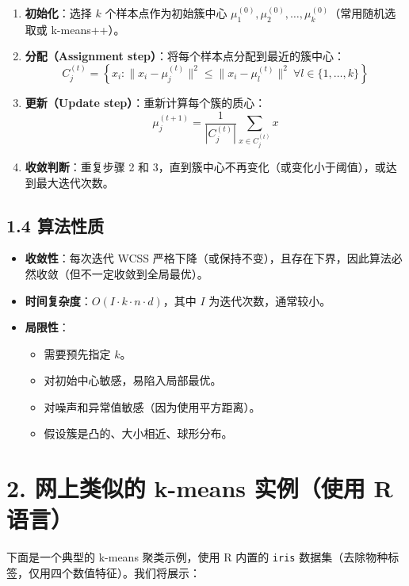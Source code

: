 \documentclass[
]{article}
\providecommand{\tightlist}{%
  \setlength{\itemsep}{0pt}\setlength{\parskip}{0pt}}
\begin{document}
\begin{enumerate}
\def\labelenumi{\arabic{enumi}.}
\tightlist
\item
  \textbf{初始化}：选择 \(k\) 个样本点作为初始簇中心
  \(\mu_1^{(0)}, \mu_2^{(0)}, \dots, \mu_k^{(0)}\)（常用随机选取或
  k-means++）。
\item
  \textbf{分配（Assignment step）}：将每个样本点分配到最近的簇中心： \[
  C_j^{(t)} = \left\{ x_i : \|x_i - \mu_j^{(t)}\|^2 \le \|x_i - \mu_l^{(t)}\|^2 \ \forall l \in \{1,\dots,k\} \right\}
  \]
\item
  \textbf{更新（Update step）}：重新计算每个簇的质心： \[
  \mu_j^{(t+1)} = \frac{1}{|C_j^{(t)}|} \sum_{x \in C_j^{(t)}} x
  \]
\item
  \textbf{收敛判断}：重复步骤 2 和
  3，直到簇中心不再变化（或变化小于阈值），或达到最大迭代次数。
\end{enumerate}

\subsection{1.4 算法性质}\label{ux7b97ux6cd5ux6027ux8d28}

\begin{itemize}
\tightlist
\item
  \textbf{收敛性}：每次迭代 WCSS
  严格下降（或保持不变），且存在下界，因此算法必然收敛（但不一定收敛到全局最优）。
\item
  \textbf{时间复杂度}：\(O(I \cdot k \cdot n \cdot d)\)，其中 \(I\)
  为迭代次数，通常较小。
\item
  \textbf{局限性}：

  \begin{itemize}
  \tightlist
  \item
    需要预先指定 \(k\)。
  \item
    对初始中心敏感，易陷入局部最优。
  \item
    对噪声和异常值敏感（因为使用平方距离）。
  \item
    假设簇是凸的、大小相近、球形分布。
  \end{itemize}
\end{itemize}

\section{2. 网上类似的 k-means 实例（使用 R
语言）}\label{ux7f51ux4e0aux7c7bux4f3cux7684-k-means-ux5b9eux4f8bux4f7fux7528-r-ux8bedux8a00}

下面是一个典型的 k-means 聚类示例，使用 R 内置的 \texttt{iris}
数据集（去除物种标签，仅用四个数值特征）。我们将展示：
\end{document}
